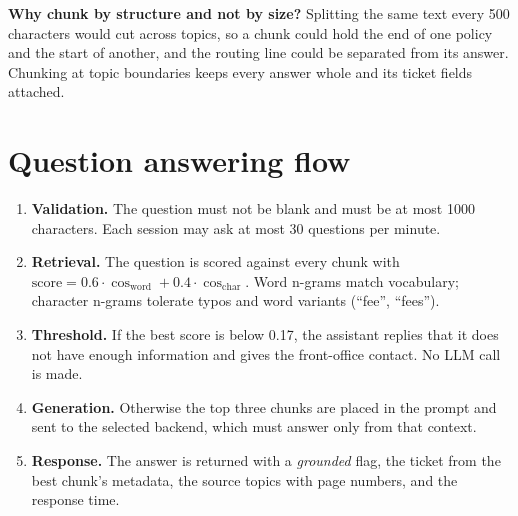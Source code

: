\documentclass[11pt,a4paper]{report}
\begin{document}
\noindent\textbf{Why chunk by structure and not by size?} Splitting the same text every 500
characters would cut across topics, so a chunk could hold the end of one policy and the start of
another, and the routing line could be separated from its answer. Chunking at topic boundaries
keeps every answer whole and its ticket fields attached.

\section{Question answering flow}
\begin{enumerate}
  \item \textbf{Validation.} The question must not be blank and must be at most 1000 characters.
        Each session may ask at most 30 questions per minute.
  \item \textbf{Retrieval.} The question is scored against every chunk with
        $\text{score} = 0.6\cdot\cos_{\text{word}} + 0.4\cdot\cos_{\text{char}}$. Word n-grams
        match vocabulary; character n-grams tolerate typos and word variants (``fee'', ``fees'').
  \item \textbf{Threshold.} If the best score is below 0.17, the assistant replies that it does
        not have enough information and gives the front-office contact. No LLM call is made.
  \item \textbf{Generation.} Otherwise the top three chunks are placed in the prompt and sent to
        the selected backend, which must answer only from that context.
  \item \textbf{Response.} The answer is returned with a \emph{grounded} flag, the ticket from the
        best chunk's metadata, the source topics with page numbers, and the response time.
\end{enumerate}
\end{document}
